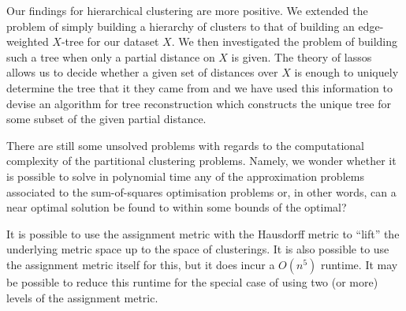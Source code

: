 Our findings for hierarchical clustering are more positive.  We extended the
problem of simply building a hierarchy of clusters to that of building an
edge-weighted $X$-tree for our dataset $X$.  We then investigated the problem
of building such a tree when only a partial distance on $X$ is given.  The
theory of lassos allows us to decide whether a given set of distances over $X$
is enough to uniquely determine the tree that it they came from and we have
used this information to devise an algorithm for tree reconstruction which
constructs the unique tree for some subset of the given partial distance.



There are still some unsolved problems with regards to the computational
complexity of the partitional clustering problems.  Namely, we wonder whether
it is possible to solve in polynomial time any of the approximation problems
associated to the sum-of-squares optimisation problems or, in other words, can
a near optimal solution be found to within some bounds of the optimal?

It is possible to use the assignment metric with the Hausdorff metric to
``lift'' the underlying metric space up to the space of clusterings.  It is
also possible to use the assignment metric itself for this, but it does incur
a $O(n^5)$ runtime.  It may be possible to reduce this runtime for the special
case of using two (or more) levels of the assignment metric.



